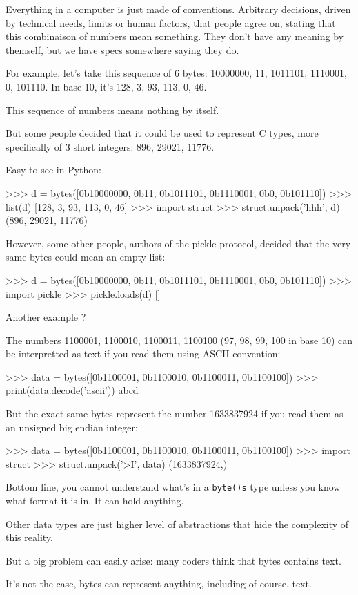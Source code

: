Everything in a computer is just made of conventions. Arbitrary decisions, driven by technical needs, limits or human factors, that people agree on, stating that this combinaison of numbers mean something. They don't have any meaning by themself, but we have specs somewhere saying they do.

For example, let's take this sequence of 6 bytes: 10000000, 11, 1011101, 1110001, 0, 101110. In base 10, it's 128, 3, 93, 113, 0, 46.

This sequence of numbers means nothing by itself.

But some people decided that it could be used to represent C types, more specifically of 3 short integers: 896, 29021, 11776.

Easy to see in Python:

>>> d = bytes([0b10000000, 0b11, 0b1011101, 0b1110001, 0b0, 0b101110])
>>> list(d)
[128, 3, 93, 113, 0, 46]
>>> import struct
>>> struct.unpack('hhh', d)
(896, 29021, 11776)

However, some other people, authors of the pickle protocol, decided that the very same bytes could mean an empty list:

>>> d = bytes([0b10000000, 0b11, 0b1011101, 0b1110001, 0b0, 0b101110])
>>> import pickle
>>> pickle.loads(d)
[]

Another example ?

The numbers 1100001, 1100010, 1100011, 1100100 (97, 98, 99, 100 in base 10) can be interpretted as text if you read them using ASCII convention:

>>> data = bytes([0b1100001, 0b1100010, 0b1100011, 0b1100100])
>>> print(data.decode('ascii'))
abcd

But the exact same bytes represent the number 1633837924 if you read them as an unsigned big endian integer:

>>> data = bytes([0b1100001, 0b1100010, 0b1100011, 0b1100100])
>>> import struct
>>> struct.unpack('>I', data)
(1633837924,)

Bottom line, you cannot understand what's in a \lstinline{byte()s} type unless you know what format it is in. It can hold anything.

Other data types are just higher level of abstractions that hide the complexity of this reality.

But a big problem can easily arise: many coders think that bytes contains text.

It's not the case, bytes can represent anything, including of course, text.

